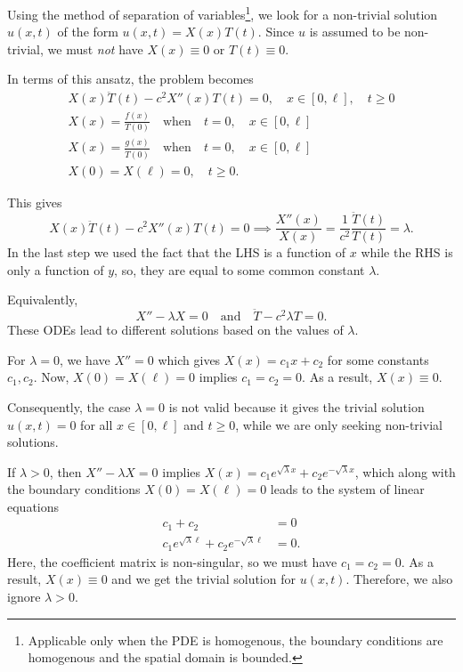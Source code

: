 \documentclass[11pt]{penrose}
\begin{document}
Using the method of separation of variables\footnote{Applicable only when the PDE is homogenous, the boundary conditions are homogenous and the spatial domain is bounded.}, we look for a non-trivial solution $u(x,t)$ of the form $u(x,t) = X(x) T(t)$. Since $u$ is assumed to be non-trivial, we must \emph{not} have $X(x) \equiv 0$ or $T(t) \equiv 0$.

In terms of this ansatz, the problem becomes
\begin{gather}
    X(x) \ddot{T}(t) - c^2 X''(x) T(t) = 0, \quad x \in [0, \ell], \quad t \geq 0\\
    X(x) = \frac{f(x)}{T(0)} \quad\text{when}\quad t = 0, \quad x \in [0, \ell]\\
    X(x) = \frac{g(x)}{\dot{T}(0)} \quad\text{when}\quad t = 0, \quad x \in [0, \ell]\\
    X(0) = X(\ell) = 0, \quad t \geq 0.
\end{gather}

This gives
\begin{equation}
    X(x) \ddot{T}(t) - c^2 X''(x) T(t) = 0
    \implies
    \frac{X''(x)}{X(x)} = \frac{1}{c^2} \frac{\ddot{T}(t)}{T(t)} = \lambda.
\end{equation}
In the last step we used the fact that the LHS is a function of $x$ while the RHS is only a function of $y$, so, they are equal to some common constant $\lambda$.

Equivalently,
\begin{equation}
    X'' - \lambda X = 0
    \quad\text{and}\quad
    \ddot{T} - c^2 \lambda T = 0.
\end{equation}
These ODEs lead to different solutions based on the values of $\lambda$.

For $\lambda = 0$, we have $X'' = 0$ which gives $X(x) = c_1 x + c_2$ for some constants $c_1, c_2$. Now, $X(0)=X(\ell)=0$ implies $c_1 = c_2 = 0$. As a result, $X(x) \equiv 0$.

Consequently, the case $\lambda = 0$ is not valid because it gives the trivial solution $u(x,t) = 0$ for all $x \in [0, \ell]$ and $t \geq 0$, while we are only seeking non-trivial solutions.

If $\lambda > 0$, then $X'' - \lambda X = 0$ implies $X(x) = c_1 e^{\sqrt{\lambda}x} + c_2 e^{-\sqrt{\lambda}x}$, which along with the boundary conditions $X(0) = X(\ell) = 0$ leads to the system of linear equations
\begin{align}
    c_1 + c_2 &= 0 \\
    c_1 e^{\sqrt{\lambda}\ell} + c_2 e^{-\sqrt{\lambda}\ell} &= 0.
\end{align}
Here, the coefficient matrix is non-singular, so we must have $c_1 = c_2 = 0$. As a result, $X(x) \equiv 0$ and we get the trivial solution for $u(x,t)$. Therefore, we also ignore $\lambda > 0$.
\end{document}
